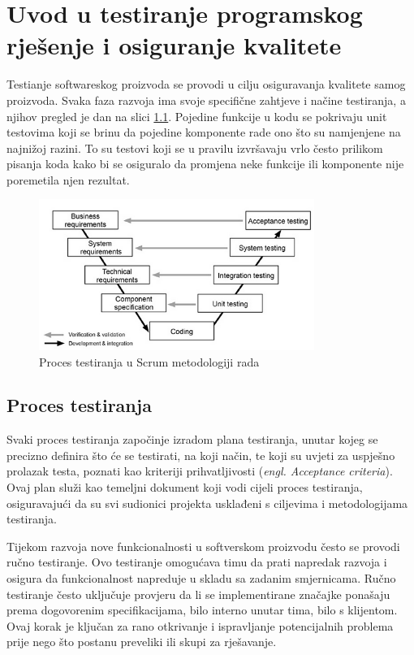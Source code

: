 \chapter{Uvod u testiranje programskog rješenje i osiguranje kvalitete}\label{uvodQA}

Testianje softwareskog proizvoda se provodi u cilju osiguravanja kvalitete samog proizvoda.
Svaka faza razvoja ima svoje specifične zahtjeve i načine testiranja, a njihov pregled je dan na slici \ref{img:testingInScrum}.
Pojedine funkcije u kodu se pokrivaju unit testovima koji se brinu da pojedine komponente rade ono što su namjenjene na najnižoj razini. To su testovi koji se u pravilu izvršavaju vrlo često prilikom pisanja koda kako bi se osiguralo da promjena neke funkcije ili komponente nije poremetila njen rezultat.


\begin{figure}[!h]\begin{center}
\includegraphics[width=0.8\textwidth]{"img/testPhasesScrum"}
\caption{Proces testiranja u Scrum metodologiji rada}\label{img:testingInScrum}
\end{center}\end{figure}

\section{Proces testiranja}
Svaki proces testiranja započinje izradom plana testiranja, unutar kojeg se precizno definira što će se testirati, na koji način, te koji su uvjeti za uspješno prolazak testa, poznati kao kriteriji prihvatljivosti (\textit{engl. Acceptance criteria}).
Ovaj plan služi kao temeljni dokument koji vodi cijeli proces testiranja, osiguravajući da su svi sudionici projekta usklađeni s ciljevima i metodologijama testiranja.

Tijekom razvoja nove funkcionalnosti u softverskom proizvodu često se provodi ručno testiranje.
Ovo testiranje omogućava timu da prati napredak razvoja i osigura da funkcionalnost napreduje u skladu sa zadanim smjernicama.
Ručno testiranje često uključuje provjeru da li se implementirane značajke ponašaju prema dogovorenim specifikacijama, bilo interno unutar tima, bilo s klijentom.
Ovaj korak je ključan za rano otkrivanje i ispravljanje potencijalnih problema prije nego što postanu preveliki ili skupi za rješavanje.

